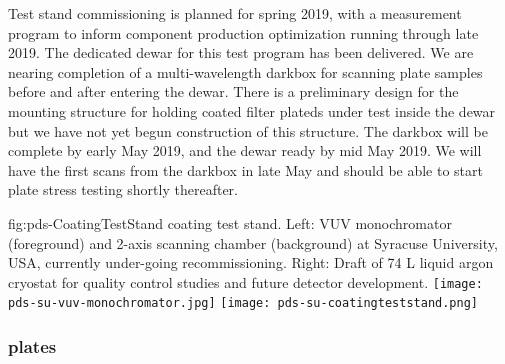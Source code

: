

 Test stand commissioning is planned for spring 2019, with a measurement program to inform component production optimization running through late 2019.  The dedicated dewar for this test program has been delivered. We are nearing completion of a multi-wavelength darkbox for scanning plate samples before and after entering the dewar. There is a preliminary design for the mounting structure for holding coated filter plateds under test inside the dewar but we have not yet begun construction of this structure. The darkbox will be complete by early May 2019, and the dewar ready by mid May 2019. We will have the first scans from the darkbox in late May and should be able to start plate stress testing shortly thereafter.
 

\begin{dunefigure}
 {fig:pds-CoatingTestStand}
 { coating test stand. Left: VUV monochromator (foreground) and 2-axis scanning chamber (background) at Syracuse University, USA, currently under-going recommissioning. Right: Draft of 74 L liquid argon cryostat for quality control studies and future detector development.}
\texttt{[image: pds-su-vuv-monochromator.jpg]}
\hspace{0.02\textwidth}
\texttt{[image: pds-su-coatingteststand.png]}
\end{dunefigure}



\subsubsection{ plates}

